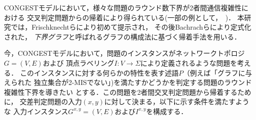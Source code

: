\documentclass[11pt,a4paper]{jarticle}
\newcommand{\CONGEST}{\textsf{CONGEST}}
\theoremstyle{definition}
\begin{document}
{\CONGEST}モデルにおいて，様々な問題のラウンド数下界が2者間通信複雑性における
交叉判定問題からの帰着により得られている(一部の例として，~\cite{sarma2012distributed,fischer2018possibilities,czumaj2020detecting})．
本研究では，Frischknechtら\cite{frischknecht2012networks}により初めて提示され，
その後Bachrachら\cite{bacrach2019hardness}により定式化された，
\emph{下界グラフ}と呼ばれるグラフの構成法に基づく帰着手法を用いる．

今，{\CONGEST}モデルにおいて，問題のインスタンスがネットワークトポロジ$G = (V, E)$および
頂点ラベリング$I : V \to \Sigma$により定義されるような問題を考える．
このインスタンスに対する何らかの特性を表す述語$P$（例えば「グラフに与えられた
独立集合が2-MISでない」)を満たすかどうかを判定する問題のラウンド複雑性下界を導きたい
とする．この問題を2者間交叉判定問題から帰着するために，
交差判定問題の入力$(x, y)$に対して決まる，以下に示す条件を満たすような
入力インスタンス$G^{x, y} = (V, E)$および$I^{x, y}$を構成する．
\end{document}
